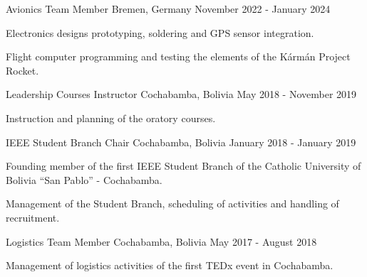 

\begin{cventries}
  {Avionics Team Member}
  {Bremen, Germany}
  {November 2022 - January 2024}
  {%
    \begin{cvitems}
      \item Electronics designs prototyping, soldering and  GPS sensor
      integration.
      \item Flight computer programming and testing the elements of
      the Kármán Project Rocket.
    \end{cvitems}
  }%

  {Leadership Courses Instructor}
  {Cochabamba, Bolivia}
  {May 2018 - November 2019}
  {%
    \begin{cvitems}
      \item Instruction and planning of the oratory courses.
    \end{cvitems}
  }

  {IEEE Student Branch Chair}
  {Cochabamba, Bolivia} 
  {January 2018 - January 2019} 
  {%
    \begin{cvitems}
      \item Founding member of the first IEEE Student Branch of the
      Catholic University of Bolivia ``San Pablo'' - Cochabamba.
      \item Management of the Student Branch, scheduling of activities
      and handling of recruitment.
    \end{cvitems}
  }

  {Logistics Team Member}
  {Cochabamba, Bolivia}
  {May 2017 - August 2018}
  {%
    \begin{cvitems}
      \item Management of logistics activities of the first TEDx event
      in Cochabamba.
    \end{cvitems}
  }

\end{cventries}
